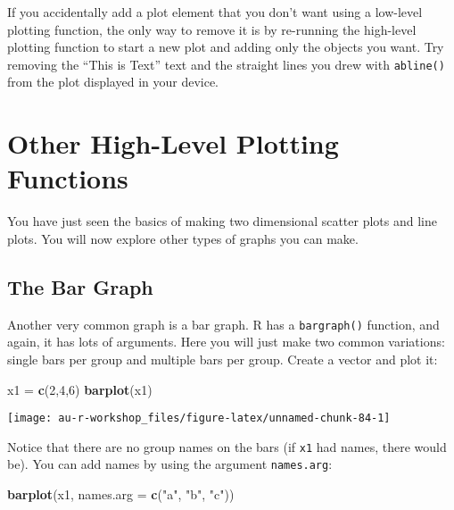 \documentclass[]{book}
\newenvironment{Shaded}{\begin{snugshade}}{\end{snugshade}}
\newcommand{\KeywordTok}[1]{\textcolor[rgb]{0.13,0.29,0.53}{\textbf{#1}}}
\newcommand{\DataTypeTok}[1]{\textcolor[rgb]{0.13,0.29,0.53}{#1}}
\newcommand{\DecValTok}[1]{\textcolor[rgb]{0.00,0.00,0.81}{#1}}
\newcommand{\StringTok}[1]{\textcolor[rgb]{0.31,0.60,0.02}{#1}}
\newcommand{\NormalTok}[1]{#1}
\theoremstyle{definition}
\theoremstyle{definition}
\theoremstyle{definition}
\theoremstyle{remark}
\begin{document}
If you accidentally add a plot element that you don't want using a
low-level plotting function, the only way to remove it is by re-running
the high-level plotting function to start a new plot and adding only the
objects you want. Try removing the ``This is Text'' text and the
straight lines you drew with \texttt{abline()} from the plot displayed
in your device.

\section{Other High-Level Plotting
Functions}\label{other-high-level-plotting-functions}

You have just seen the basics of making two dimensional scatter plots
and line plots. You will now explore other types of graphs you can make.

\subsection{The Bar Graph}\label{the-bar-graph}

Another very common graph is a bar graph. R has a \texttt{bargraph()}
function, and again, it has lots of arguments. Here you will just make
two common variations: single bars per group and multiple bars per
group. Create a vector and plot it:

\begin{Shaded}
\begin{Highlighting}[]
\NormalTok{x1 =}\StringTok{ }\KeywordTok{c}\NormalTok{(}\DecValTok{2}\NormalTok{,}\DecValTok{4}\NormalTok{,}\DecValTok{6}\NormalTok{)}
\KeywordTok{barplot}\NormalTok{(x1)}
\end{Highlighting}
\end{Shaded}

\begin{center}\texttt{[image: au-r-workshop\_files/figure-latex/unnamed-chunk-84-1]} \end{center}

Notice that there are no group names on the bars (if \texttt{x1} had
names, there would be). You can add names by using the argument
\texttt{names.arg}:

\begin{Shaded}
\begin{Highlighting}[]
\KeywordTok{barplot}\NormalTok{(x1, }\DataTypeTok{names.arg =} \KeywordTok{c}\NormalTok{(}\StringTok{"a"}\NormalTok{, }\StringTok{"b"}\NormalTok{, }\StringTok{"c"}\NormalTok{))}
\end{Highlighting}
\end{Shaded}
\end{document}
